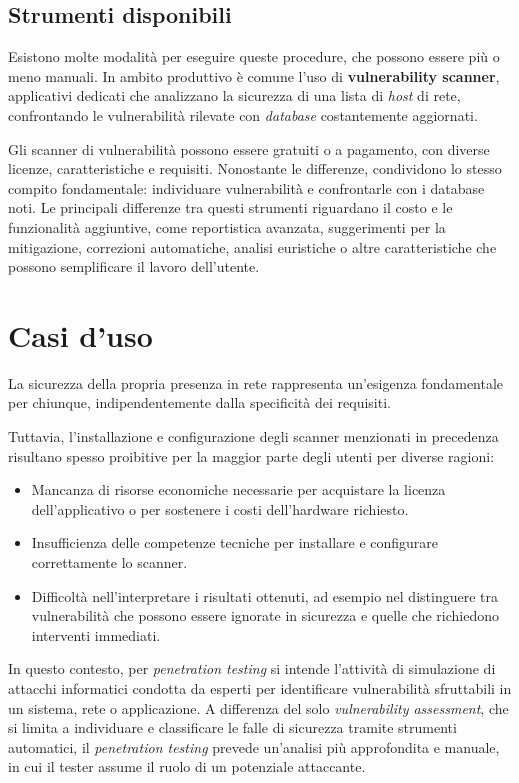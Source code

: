 \subsection{Strumenti disponibili}
Esistono molte modalità per eseguire queste procedure, che possono essere più o meno manuali. In ambito produttivo è comune l'uso di \textbf{vulnerability scanner}, applicativi dedicati che analizzano la sicurezza di una lista di \emph{host} di rete, confrontando le vulnerabilità rilevate con \emph{database} costantemente aggiornati.

Gli scanner di vulnerabilità possono essere gratuiti o a pagamento, con diverse licenze, caratteristiche e requisiti. Nonostante le differenze, condividono lo stesso compito fondamentale: individuare vulnerabilità e confrontarle con i database noti. Le principali differenze tra questi strumenti riguardano il costo e le funzionalità aggiuntive, come reportistica avanzata, suggerimenti per la mitigazione, correzioni automatiche, analisi euristiche o altre caratteristiche che possono semplificare il lavoro dell'utente.

\section{Casi d'uso}
La sicurezza della propria presenza in rete rappresenta un'esigenza fondamentale per chiunque, indipendentemente dalla specificità dei requisiti.

Tuttavia, l'installazione e configurazione degli scanner menzionati in precedenza risultano spesso proibitive per la maggior parte degli utenti per diverse ragioni:
\begin{itemize}
    \item Mancanza di risorse economiche necessarie per acquistare la licenza dell'applicativo o per sostenere i costi dell'hardware richiesto.
    \item Insufficienza delle competenze tecniche per installare e configurare correttamente lo scanner.
    \item Difficoltà nell'interpretare i risultati ottenuti, ad esempio nel distinguere tra vulnerabilità che possono essere ignorate in sicurezza e quelle che richiedono interventi immediati.
\end{itemize}

In questo contesto, per \emph{penetration testing} si intende l'attività di simulazione di attacchi informatici condotta da esperti per identificare vulnerabilità sfruttabili in un sistema, rete o applicazione. A differenza del solo \emph{vulnerability assessment}, che si limita a individuare e classificare le falle di sicurezza tramite strumenti automatici, il \emph{penetration testing} prevede un'analisi più approfondita e manuale, in cui il tester assume il ruolo di un potenziale attaccante.

